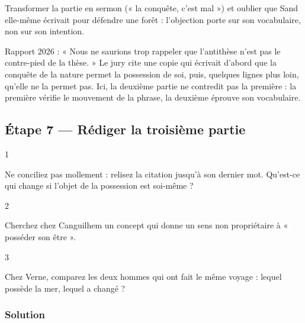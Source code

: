 \documentclass[11pt,a4paper]{article}
\begin{document}
\begin{piege}

Transformer la partie en sermon (« la conquête, c'est mal ») et oublier que Sand elle-même écrivait pour défendre une forêt : l'objection porte sur son vocabulaire, non sur son intention.

\end{piege}

\begin{jury}

Rapport 2026 : « Nous ne saurions trop rappeler que l'antithèse n'est pas le contre-pied de la thèse. » Le jury cite une copie qui écrivait d'abord que la conquête de la nature permet la possession de soi, puis, quelques lignes plus loin, qu'elle ne la permet pas. Ici, la deuxième partie ne contredit pas la première : la première vérifie le mouvement de la phrase, la deuxième éprouve son vocabulaire.

\end{jury}

\hypertarget{uxe9tape-7-ruxe9diger-la-troisiuxe8me-partie}{%
\subsection{Étape 7 --- Rédiger la troisième partie}\label{uxe9tape-7-ruxe9diger-la-troisiuxe8me-partie}}

\begin{indication}{1}

Ne conciliez pas mollement : relisez la citation jusqu'à son dernier mot. Qu'est-ce qui change si l'objet de la possession est soi-même ?

\end{indication}

\begin{indication}{2}

Cherchez chez Canguilhem un concept qui donne un sens non propriétaire à « posséder son être ».

\end{indication}

\begin{indication}{3}

Chez Verne, comparez les deux hommes qui ont fait le même voyage : lequel possède la mer, lequel a changé ?

\end{indication}

\hypertarget{solution-6}{%
\subsubsection{Solution}\label{solution-6}}
\end{document}
